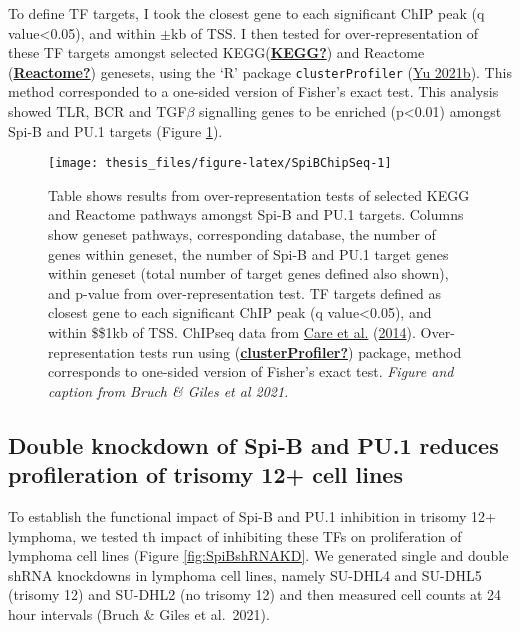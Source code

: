 \documentclass[11pt, a4paper, twosided]{book}
\begin{document}
To define TF targets, I took the closest gene to each significant ChIP peak (q value\textless0.05), and within \(\pm\)kb of TSS. I then tested for over-representation of these TF targets amongst selected KEGG(\protect\hyperlink{ref-KEGG}{\textbf{KEGG?}}) and Reactome (\protect\hyperlink{ref-Reactome}{\textbf{Reactome?}}) genesets, using the `R' package \texttt{clusterProfiler} (\protect\hyperlink{ref-R-clusterProfiler}{Yu 2021b}). This method corresponded to a one-sided version of Fisher's exact test. This analysis showed TLR, BCR and TGF\(\beta\) signalling genes to be enriched (p\textless0.01) amongst Spi-B and PU.1 targets (Figure \ref{fig:SpiBChipSeq}).


\begin{figure}

{\centering \texttt{[image: thesis\_files/figure-latex/SpiBChipSeq-1]} 

}

\caption{Table shows results from over-representation tests of selected KEGG and Reactome pathways amongst Spi-B and PU.1 targets. Columns show geneset pathways, corresponding database, the number of genes within geneset, the number of Spi-B and PU.1 target genes within geneset (total number of target genes defined also shown), and p-value from over-representation test. TF targets defined as closest gene to each significant ChIP peak (q value\textless0.05), and within \$\pm\$1kb of TSS. ChIPseq data from \protect\hyperlink{ref-Care2014}{Care et al.} (\protect\hyperlink{ref-Care2014}{2014}). Over-representation tests run using (\protect\hyperlink{ref-clusterProfiler}{\textbf{clusterProfiler?}}) package, method corresponds to one-sided version of Fisher's exact test. \emph{Figure and caption from Bruch \& Giles et al 2021.}}\label{fig:SpiBChipSeq}
\end{figure}
\hypertarget{double-knockdown-of-spi-b-and-pu.1-reduces-profileration-of-trisomy-12-cell-lines}{%
\subsection{Double knockdown of Spi-B and PU.1 reduces profileration of trisomy 12+ cell lines}\label{double-knockdown-of-spi-b-and-pu.1-reduces-profileration-of-trisomy-12-cell-lines}}

To establish the functional impact of Spi-B and PU.1 inhibition in trisomy 12+ lymphoma, we tested th impact of inhibiting these TFs on proliferation of lymphoma cell lines (Figure \ref{fig:SpiBshRNAKD}. We generated single and double shRNA knockdowns in lymphoma cell lines, namely SU-DHL4 and SU-DHL5 (trisomy 12) and SU-DHL2 (no trisomy 12) and then measured cell counts at 24 hour intervals (Bruch \& Giles et al.~2021).
\end{document}
